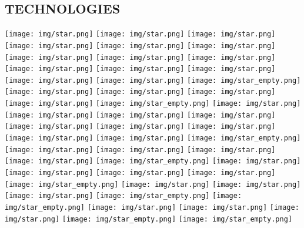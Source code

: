 \documentclass[]{cv-class}
\begin{document}
\begin{aside}
  \section{TECHNOLOGIES}
    {\texttt{[image: img/star.png]}
    \texttt{[image: img/star.png]}
    \texttt{[image: img/star.png]}
    \texttt{[image: img/star.png]}
    \texttt{[image: img/star.png]}}
    {\texttt{[image: img/star.png]}
    \texttt{[image: img/star.png]}
    \texttt{[image: img/star.png]}
    \texttt{[image: img/star.png]}
    \texttt{[image: img/star.png]}}
    {\texttt{[image: img/star.png]}
    \texttt{[image: img/star.png]}
    \texttt{[image: img/star.png]}
    \texttt{[image: img/star.png]}
    \texttt{[image: img/star\_empty.png]}}
    {\texttt{[image: img/star.png]}
    \texttt{[image: img/star.png]}
    \texttt{[image: img/star.png]}
    \texttt{[image: img/star.png]}
    \texttt{[image: img/star\_empty.png]}}    
    {\texttt{[image: img/star.png]}
    \texttt{[image: img/star.png]}
    \texttt{[image: img/star.png]}
    \texttt{[image: img/star.png]}
    \texttt{[image: img/star.png]}}
    {\texttt{[image: img/star.png]}
    \texttt{[image: img/star.png]}
    \texttt{[image: img/star.png]}
    \texttt{[image: img/star.png]}
    \texttt{[image: img/star\_empty.png]}}
    {\texttt{[image: img/star.png]}
    \texttt{[image: img/star.png]}
    \texttt{[image: img/star.png]}
    \texttt{[image: img/star.png]}
    \texttt{[image: img/star\_empty.png]}}
    {\texttt{[image: img/star.png]}
    \texttt{[image: img/star.png]}
    \texttt{[image: img/star.png]}
    \texttt{[image: img/star.png]}
    \texttt{[image: img/star\_empty.png]}}
    {\texttt{[image: img/star.png]}
    \texttt{[image: img/star.png]}
    \texttt{[image: img/star.png]}
    \texttt{[image: img/star\_empty.png]}
    \texttt{[image: img/star\_empty.png]}}
    {\texttt{[image: img/star.png]}
    \texttt{[image: img/star.png]}
    \texttt{[image: img/star.png]}
    \texttt{[image: img/star\_empty.png]}
    \texttt{[image: img/star\_empty.png]}}
    ~
      ~

\end{aside}
\end{document}

